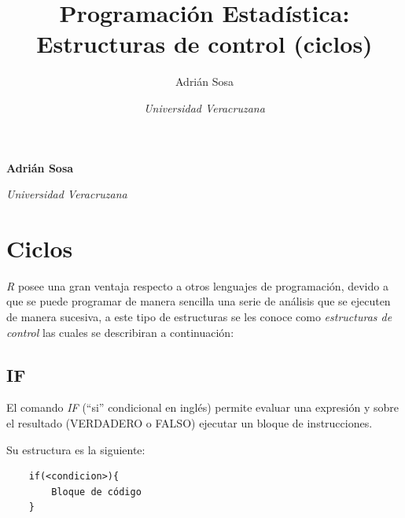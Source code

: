 \documentclass[11pt,]{article}
\title{Programación Estadística: Estructuras de control (ciclos)  }
\author{\Large Adrián Sosa\vspace{0.05in} \newline\normalsize\emph{}   \and \Large \vspace{0.05in} \newline\normalsize\emph{Universidad Veracruzana}  }
\date{}
\newcommand*{\authorfont}{\fontfamily{phv}\selectfont}
\begin{document}
	
%

{%
\setlength{\parindent}{0pt}
\thispagestyle{plain}
{\fontsize{18}{20}\selectfont\raggedright 
\maketitle  %

}

{
   \vskip 13.5pt\relax \normalsize\fontsize{11}{12} 
\textbf{\authorfont Adrián Sosa} \hskip 15pt \emph{\small }   \par \textbf{\authorfont } \hskip 15pt \emph{\small Universidad Veracruzana}   

}

}






\vskip -8.5pt



\noindent  

\hypertarget{ciclos}{%
\section{Ciclos}\label{ciclos}}

\emph{R} posee una gran ventaja respecto a otros lenguajes de
programación, devido a que se puede programar de manera sencilla una
serie de análisis que se ejecuten de manera sucesiva, a este tipo de
estructuras se les conoce como \emph{estructuras de control} las cuales
se describiran a continuación:

\hypertarget{if}{%
\subsection{IF}\label{if}}

El comando \emph{IF} (``si'' condicional en inglés) permite evaluar una
expresión y sobre el resultado (VERDADERO o FALSO) ejecutar un bloque de
instrucciones.

Su estructura es la siguiente:

\begin{verbatim}
    if(<condicion>){
        Bloque de código
    }
\end{verbatim}
\end{document}

